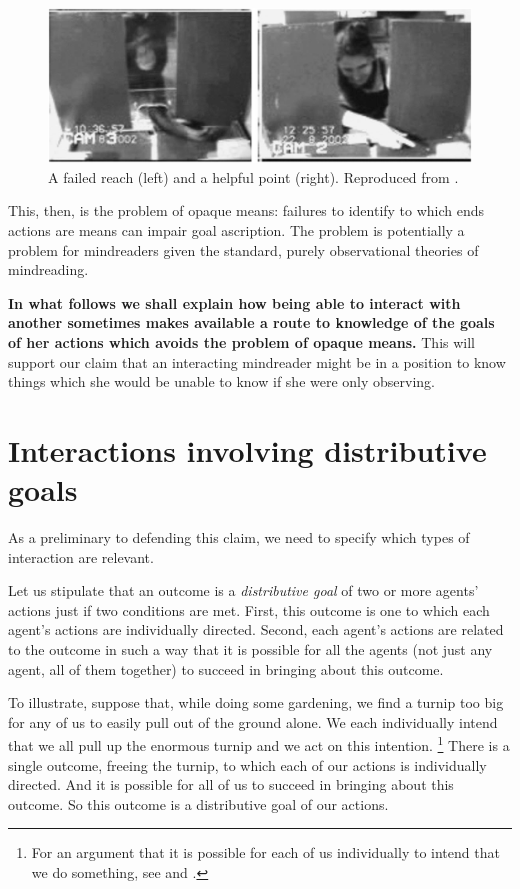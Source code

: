 \documentclass[12pt,\papersize]{extarticle}
\begin{document}
\begin{figure}
\begin{center}
\includegraphics[width=12cm]{figure_hare_toma_2004_e3.png}
\caption{
\label{fig:reach_point}
	A failed reach (left) and a helpful point (right).
	Reproduced from \citet[p.\ 557, figure 4]{hare_chimpanzees_2004}.
}
\end{center}
\end{figure}

This, then, is the problem of opaque means:
failures to identify to which ends actions are means can impair goal ascription.
The problem is potentially a problem for mindreaders given the standard, purely observational theories of mindreading.

\textbf{In what follows we shall explain how being able to interact with another sometimes makes available a route to knowledge of the goals of her actions  which avoids the problem of opaque means.}
This will support our claim that an interacting mindreader might be in a position to know things which she would be unable to know if she were only observing.


\section{Interactions involving distributive goals}
\label{sec:joint_action}
As a preliminary to defending this claim,
we need to specify which types of interaction are relevant.

Let us stipulate that an outcome is a \emph{distributive goal} of two or more agents' actions just if two conditions are met.
\label{df:distributive_goal}
First, this outcome is  one to which each agent's actions are individually directed.
Second, each agent's actions are related to the outcome in such a way that it is possible for all the agents (not just any agent, all of them together) to succeed in bringing about this outcome.

To illustrate,
suppose that, while doing some gardening,
we find a turnip too big for any of us to easily pull out of the ground alone.
We each individually intend that we all pull up the enormous turnip
and we act on this intention.%
\footnote{
For an argument that it is possible for each of us individually to intend that we do something, see \citet{Bratman:1999fr} and \citet{Bratman:2012fk}.
}
There is a single outcome,
freeing the turnip,
to which each of our actions is individually directed.
And it is possible for all of us to succeed in bringing about this outcome.
So this outcome is a distributive goal of our actions.
\end{document}
